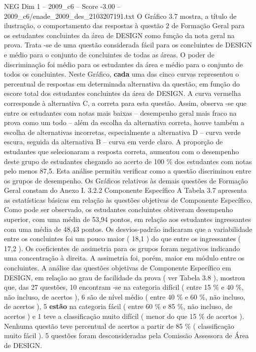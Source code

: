 \begin{textsample}{NEG Dim 1 – 2009\_c6 – Score -3.00 – 2009\_c6/enade\_2009\_des\_2103207191.txt}
O Gráfico 3.7 mostra, a título de ilustração, o comportamento das respostas à questão 2 de Formação Geral para os estudantes concluintes da área de DESIGN como função da nota geral na prova.
Trata -se de uma questão considerada fácil para os concluintes de DESIGN e médio para o conjunto de concluintes de todas as áreas.
O poder de discriminação foi médio para os estudantes da área e médio para o conjunto de todos os concluintes.
Neste Gráfico, \textbf{cada} uma das cinco curvas representou o percentual de respostas em determinada alternativa da questão, em função do escore total dos estudantes concluintes da área de DESIGN.
A curva vermelha corresponde à alternativa C, a correta para esta questão.
Assim, observa -se que entre os estudantes com notas mais baixas – desempenho geral mais fraco na prova como um todo – além da escolha da alternativa correta, houve também a escolha de alternativas incorretas, especialmente a alternativa D – curva verde escura, seguida da alternativa B – curva em verde claro.
A proporção de estudantes que selecionaram a resposta correta, aumentou com o desempenho deste grupo de estudantes chegando ao acerto de 100 \% dos estudantes com notas pelo menos 87,5.
Esta análise permitiu verificar como a questão discriminou entre os grupos de desempenho.
Os Gráficos relativos às demais questões de Formação Geral constam do Anexo I. 3.2.2 Componente Específico A Tabela 3.7 apresenta as estatísticas básicas em relação às questões objetivas de Componente Específico.
Como pode ser observado, os estudantes concluintes obtiveram desempenho superior, com uma média de 53,94 pontos, em relação aos estudantes ingressantes com uma média de 48,43 pontos.
Os desvios-padrão indicaram que a variabilidade entre os concluintes foi um pouco maior ( 18,1 ) do que entre os ingressantes ( 17,2 ).
Os coeficientes de assimetria para os grupos foram negativos indicando uma concentração à direita.
A assimetria foi, porém, maior em módulo entre os concluintes.
A análise das questões objetivas de Componente Específico em DESIGN, em relação ao grau de facilidade da prova ( ver Tabela 3.8 ), mostrou que, das 27 questões, 10 encontram -se na categoria difícil ( entre 15 \% e 40 \%, não incluso, de acertos ), 6 são de nível médio ( entre 40 \% e 60 \%, não incluso, de acertos ), 5 \textbf{estão} na categoria fácil ( entre 60 \% e 85 \%, não incluso, de acertos ) e 1 teve a classificação muito difícil ( menor do que 15 \% de acertos ).
Nenhuma questão teve percentual de acertos a partir de 85 \% ( classificação muito fácil ). 5 questões foram desconsideradas pela Comissão Assessora de Área de DESIGN.

\end{textsample}
